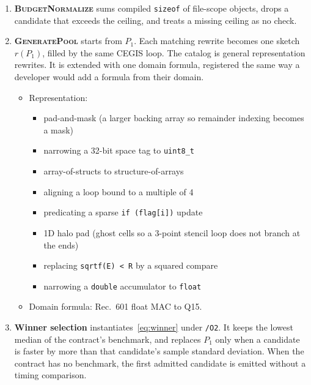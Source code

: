 \begin{enumerate}
  \item \textbf{\textsc{BudgetNormalize}} sums compiled \texttt{sizeof} of
  file-scope objects, drops a candidate that exceeds the ceiling, and
  treats a missing ceiling as no check.

  \item \textbf{\textsc{GeneratePool}} starts from \(P_1\). Each matching
  rewrite becomes one sketch \(r(P_1)\), filled by the same CEGIS loop.
  The catalog is general representation rewrites. It is extended with one
  domain formula, registered the same way a developer would add a formula
  from their domain.
  \begin{itemize}
    \item Representation:
    \begin{itemize}
      \item pad-and-mask (a larger backing array so remainder indexing
      becomes a mask)
      \item narrowing a 32-bit space tag to \texttt{uint8\_t}
      \item array-of-structs to structure-of-arrays
      \item aligning a loop bound to a multiple of 4
      \item predicating a sparse \texttt{if (flag[i])} update
      \item 1D halo pad (ghost cells so a 3-point stencil loop does not
      branch at the ends)
      \item replacing \texttt{sqrtf(E)~<~R} by a squared compare
      \item narrowing a \texttt{double} accumulator to \texttt{float}
    \end{itemize}
    \item Domain formula: Rec.~601 float MAC to Q15.
  \end{itemize}

  \item \textbf{Winner selection} instantiates~\eqref{eq:winner} under
  \texttt{/O2}. It keeps the lowest median of the contract's benchmark,
  and replaces \(P_1\) only when a candidate is faster by more than that
  candidate's sample standard deviation. When the contract has no
  benchmark, the first admitted candidate is emitted without a timing
  comparison.
\end{enumerate}

